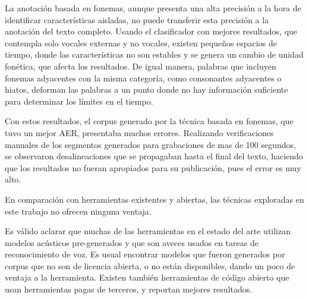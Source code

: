 La anotación basada en fonemas, aunque presenta una alta precisión a la hora de identificar características aisladas, no puede transferir esta precisión a la anotación del texto completo. Usando el clasificador con mejores resultados, que contempla solo vocales externas y no vocales, existen pequeños espacios de tiempo, donde las características no son estables y se genera un cambio de unidad fonética, que afecta los resultados. De igual manera, palabras que incluyen fonemas adyacentes con la misma categoría, como consonantes adyacentes o hiatos, deforman las palabras a un punto donde no hay información suficiente para determinar los límites en el tiempo.

Con estos resultados, el corpus generado por la técnica basada en fonemas, que tuvo un mejor AER, presentaba muchos errores. Realizando verificaciones manuales de los segmentos generados para grabaciones de mas de 100 segundos, se observaron desalineaciones que se propagaban hasta el final del texto, haciendo que los resultados no fueran apropiados para su publicación, pues el error es muy alto.

En comparación con herramientas existentes y abiertas, las técnicas exploradas en este trabajo no ofrecen ninguna ventaja. 

Es válido aclarar que muchas de las herramientas en el estado del arte utilizan modelos acústicos pre-generados y que son aveces usados en tareas de reconocimiento de voz. Es usual encontrar modelos que fueron generados por corpus que no son de licencia abierta, o no están disponibles, dando un poco de ventaja a la herramienta. Existen también herramientas de código abierto que usan herramientas pagas de terceros, y reportan mejores resultados. 
